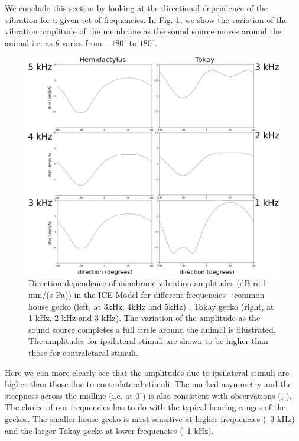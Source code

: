 We conclude this section by looking at the directional dependence of the vibration for a given set of frequencies. In Fig. \ref{directionplots}, we show the variation of the vibration amplitude of the membrane as
the sound source moves around the animal i.e. as $\theta$ varies from $-180^\circ$ to $180^\circ$.
\begin{figure}[ht!]
\centering
  \includegraphics[width=.75\linewidth]{Diagrams/Plots/directionplots/directionplots.png}
  \caption[Direction dependence of membrane vibration amplitudes for different frequencies.]{Direction dependence of membrane vibration amplitudes (dB re 1 mm/(s Pa)) in the ICE Model for different frequencies - common house gecko (left, at 3kHz, 4kHz and 5kHz)
  , Tokay gecko (right, at 1 kHz, 2 kHz and 3 kHz).
  The variation of the amplitude as the sound source completes a full circle around the animal is illustrated. The amplitudes for ipsilateral stimuli are shown to be
  higher than those for contraletaral stimuli.}
  \label{directionplots}
\end{figure}
Here we can more clearly see that the amplitudes due to ipsilateral stimuli are higher than those due to contralateral stimuli. The marked asymmetry and the steepness across the midline (i.e. at $0^\circ$)
is also consistent with observations (\cite{dalsgaardmanley1}, \cite{dalsgaardmanley2}). The choice of our frequencies has to do with the typical hearing ranges of the geckos. The smaller house
gecko is most sensitive at higher frequencies (~3 kHz) and the larger Tokay gecko at lower frequencies (~1 kHz).

